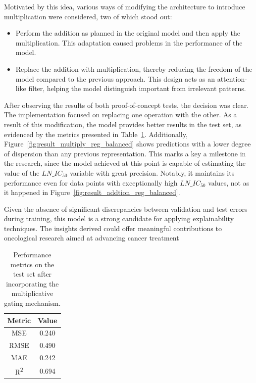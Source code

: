 Motivated by this idea, various ways of modifying the architecture to introduce multiplication were considered, two of which stood out:

\begin{itemize}
    \item Perform the addition as planned in the original model  and then apply the multiplication. This adaptation caused problems in the performance of the model.
    \item Replace the addition with multiplication, thereby reducing the freedom of the model compared to the previous approach. This design acts as an attention-like filter, helping the model distinguish important from irrelevant patterns. 
\end{itemize}


After observing the results of both proof-of-concept tests, the decision was clear. The implementation focused on replacing one operation with the other. As a result of this modification, the model provides better results in the test set, as evidenced by the metrics presented in Table~\ref{tab:metrics_multiplicative_gating}. Additionally, Figure~\ref{fig:result_multiply_reg_balanced} shows predictions with a lower degree of dispersion than any previous representation. This marks a key a milestone in the research, since the model achieved at this point is capable of estimating the value of the \(LN\_IC_{50}\) variable with great precision. Notably, it maintains its performance even for data points with exceptionally high \(LN\_IC_{50}\) values, not as it happened in Figure~\ref{fig:result_addtion_reg_balanced}. 

Given the absence of significant discrepancies between validation and test errors during training, this model is a strong candidate for applying explainability techniques. The insights derived could offer meaningful contributions to oncological research aimed at advancing cancer treatment

\begin{table}[H]
    \centering
    \begin{tabular}{|c|c|}
    \hline
    \textbf{Metric} & \textbf{Value} \\
    \hline
    MSE & 0.240 \\
    RMSE & 0.490 \\
    MAE & 0.242 \\
    R\textsuperscript{2} & 0.694 \\
    \hline
    \end{tabular}
    \caption{Performance metrics on the test set after incorporating the multiplicative gating mechanism.}
    \label{tab:metrics_multiplicative_gating}
\end{table}

